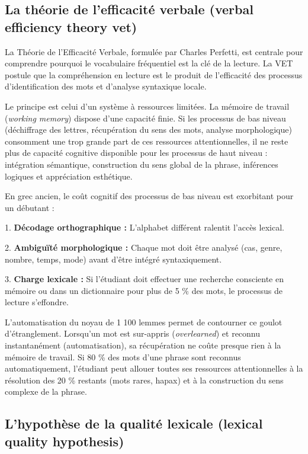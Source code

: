 {\subsection{La théorie de l'efficacité verbale (verbal efficiency theory \- vet)}

La Théorie de l'Efficacité Verbale, formulée par Charles Perfetti, est centrale pour comprendre
pourquoi le vocabulaire fréquentiel est la clé de la lecture. La VET postule que la compréhension en
lecture est le produit de l'efficacité des processus d'identification des mots et d'analyse
syntaxique locale.\cite{III-1-1-ref19}

Le principe est celui d'un système à ressources limitées. La mémoire de travail (\textit{working
memory}) dispose d'une capacité finie. Si les processus de bas niveau (déchiffrage des lettres,
récupération du sens des mots, analyse morphologique) consomment une trop grande part de ces
ressources attentionnelles, il ne reste plus de capacité cognitive disponible pour les processus de
haut niveau : intégration sémantique, construction du sens global de la phrase, inférences logiques
et appréciation esthétique.\cite{III-1-1-ref22}

En grec ancien, le coût cognitif des processus de bas niveau est exorbitant pour un débutant :

1. \textbf{Décodage orthographique :} L'alphabet différent ralentit l'accès lexical.

2. \textbf{Ambiguïté morphologique :} Chaque mot doit être analysé (cas, genre, nombre, temps, mode)
avant d'être intégré syntaxiquement.

3. \textbf{Charge lexicale :} Si l'étudiant doit effectuer une recherche consciente en mémoire ou
dans un dictionnaire pour plus de 5 \% des mots, le processus de lecture s'effondre.

L'automatisation du noyau de 1 100 lemmes permet de contourner ce goulot d'étranglement. Lorsqu'un
mot est \og sur-appris\fg{} (\textit{overlearned}) et reconnu instantanément (automatisation), sa
récupération ne coûte presque rien à la mémoire de travail.\cite{III-1-1-ref24} Si 80 \% des mots
d'une phrase sont reconnus automatiquement, l'étudiant peut allouer toutes ses ressources
attentionnelles à la résolution des 20 \% restants (mots rares, hapax) et à la construction du sens
complexe de la phrase.\cite{III-1-1-ref26}



\subsection{L'hypothèse de la qualité lexicale (lexical quality hypothesis)}

}
